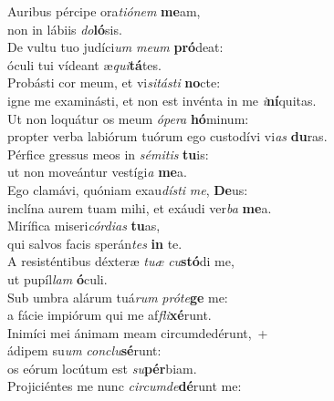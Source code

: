 \evenverse Auribus pércipe ora\textit{ti}\textit{ó}\textit{nem} \textbf{me}am,~\*\\
\evenverse non in lábiis \textit{do}\textbf{ló}sis.\\
\oddverse De vultu tuo judíci\textit{um} \textit{me}\textit{um} \textbf{pró}deat:~\*\\
\oddverse óculi tui vídeant æ\textit{qui}\textbf{tá}tes.\\
\evenverse Probásti cor meum, et vi\textit{si}\textit{tá}\textit{sti} \textbf{no}cte:~\*\\
\evenverse igne me examinásti, et non est invénta in me \textit{i}\textbf{ní}quitas.\\
\oddverse Ut non loquátur os meum \textit{ó}\textit{pe}\textit{ra} \textbf{hó}minum:~\*\\
\oddverse propter verba labiórum tuórum ego custodívi vi\textit{as} \textbf{du}ras.\\
\evenverse Pérfice gressus meos in \textit{sé}\textit{mi}\textit{tis} \textbf{tu}is:~\*\\
\evenverse ut non moveántur vestígi\textit{a} \textbf{me}a.\\
\oddverse Ego clamávi, quóniam exau\textit{dí}\textit{sti} \textit{me}, \textbf{De}us:~\*\\
\oddverse inclína aurem tuam mihi, et exáudi ver\textit{ba} \textbf{me}a.\\
\evenverse Mirífica miseri\textit{cór}\textit{di}\textit{as} \textbf{tu}as,~\*\\
\evenverse qui salvos facis sperán\textit{tes} \textbf{in} te.\\
\oddverse A resisténtibus déxteræ \textit{tu}\textit{æ} \textit{cu}\textbf{stó}di me,~\*\\
\oddverse ut pupíl\textit{lam} \textbf{ó}culi.\\
\evenverse Sub umbra alárum tuá\textit{rum} \textit{pró}\textit{te}\textbf{ge} me:~\*\\
\evenverse a fácie impiórum qui me af\textit{fli}\textbf{xé}runt.\\
\oddverse Inimíci mei ánimam meam circumdedérunt,~+\\
\oddverse  ádipem su\textit{um} \textit{con}\textit{clu}\textbf{sé}runt:~\*\\
\oddverse os eórum locútum est \textit{su}\textbf{pér}biam.\\
\evenverse Projiciéntes me nunc \textit{cir}\textit{cum}\textit{de}\textbf{dé}runt me:~\*\\

